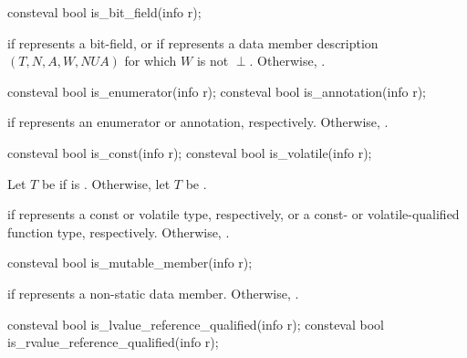 %
\begin{itemdecl}
consteval bool is_bit_field(info r);
\end{itemdecl}

\begin{itemdescr}
\pnum
\returns
{} if  represents a bit-field,
or if  represents a data member description
$(T, N, A, W, \mathit{NUA})$
for which $W$ is not $\perp$.
Otherwise, .
\end{itemdescr}

%
%
\begin{itemdecl}
consteval bool is_enumerator(info r);
consteval bool is_annotation(info r);
\end{itemdecl}

\begin{itemdescr}
\pnum
\returns
{} if  represents an enumerator or annotation, respectively.
Otherwise, .
\end{itemdescr}

%
%
\begin{itemdecl}
consteval bool is_const(info r);
consteval bool is_volatile(info r);
\end{itemdecl}

\begin{itemdescr}
\pnum
Let $T$ be  if  is .
Otherwise, let $T$ be .

\pnum
\returns
{} if  represents a const or volatile type, respectively,
or a const- or volatile-qualified function type, respectively.
Otherwise, .
\end{itemdescr}

%
\begin{itemdecl}
consteval bool is_mutable_member(info r);
\end{itemdecl}

\begin{itemdescr}
\pnum
\returns
{} if  represents a  non-static data member.
Otherwise, .
\end{itemdescr}

%
%
\begin{itemdecl}
consteval bool is_lvalue_reference_qualified(info r);
consteval bool is_rvalue_reference_qualified(info r);
\end{itemdecl}

